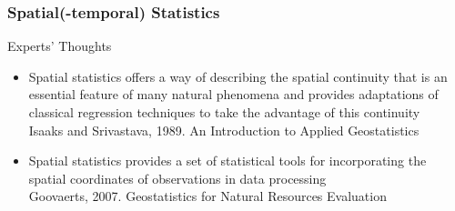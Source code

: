\documentclass{beamer}
\begin{document}
\begin{frame}
\frametitle{Spatial(-temporal) Statistics}
\begin{block}{Experts’ Thoughts}
\begin{itemize}
\item Spatial statistics offers a way of describing the spatial continuity that is an essential feature of many natural phenomena and provides adaptations of classical regression techniques to take the advantage of this continuity\\
\small \alert{Isaaks and Srivastava, 1989. An Introduction to Applied Geostatistics}
\normalsize
\vspace{1cm}
\item Spatial statistics provides a set of statistical tools for incorporating the spatial coordinates of observations in data processing\\
\small \alert{Goovaerts, 2007. Geostatistics for Natural Resources Evaluation}
\end{itemize}
\end{block}
\end{frame}

\end{document}
